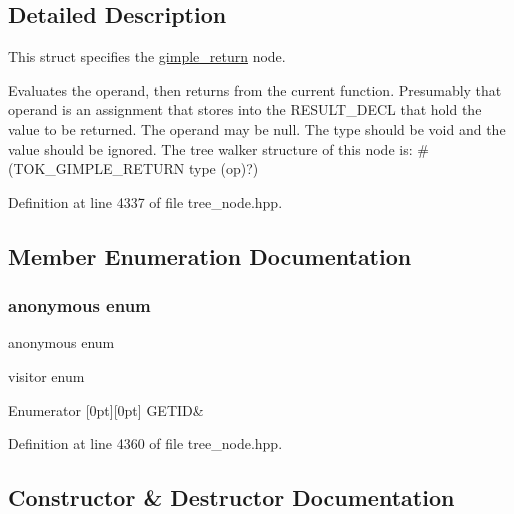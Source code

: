 \subsection{Detailed Description}
This struct specifies the \hyperlink{structgimple__return}{gimple\+\_\+return} node. 

Evaluates the operand, then returns from the current function. Presumably that operand is an assignment that stores into the R\+E\+S\+U\+L\+T\+\_\+\+D\+E\+CL that hold the value to be returned. The operand may be null. The type should be void and the value should be ignored. The tree walker structure of this node is\+: \#(T\+O\+K\+\_\+\+G\+I\+M\+P\+L\+E\+\_\+\+R\+E\+T\+U\+RN type (op)?) 

Definition at line 4337 of file tree\+\_\+node.\+hpp.



\subsection{Member Enumeration Documentation}
\mbox{\label{structgimple__return_afa2374f352ee30f8ac459161216d9ac0}} 
\subsubsection{\texorpdfstring{anonymous enum}{anonymous enum}}
{\footnotesize\ttfamily anonymous enum}



visitor enum 

\begin{DoxyEnumFields}{Enumerator}
[0pt][0pt]{}\mbox{\label{structgimple__return_afa2374f352ee30f8ac459161216d9ac0a8b3a16ecbc400fbac4508dd35079f99e}} 
G\+E\+T\+ID&\\
\hline

\end{DoxyEnumFields}


Definition at line 4360 of file tree\+\_\+node.\+hpp.



\subsection{Constructor \& Destructor Documentation}
\mbox{\label{structgimple__return_ad57a88bad1857c649e1a559f42433b05}} 
